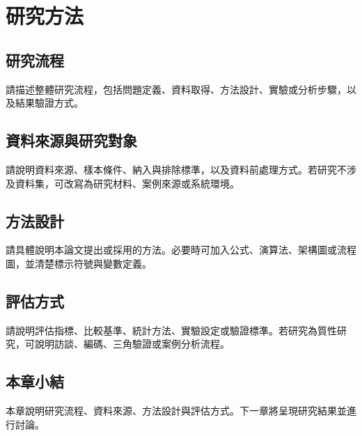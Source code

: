 \chapter{研究方法}

\section{研究流程}

請描述整體研究流程，包括問題定義、資料取得、方法設計、實驗或分析步驟，以及結果驗證方式。

\section{資料來源與研究對象}

請說明資料來源、樣本條件、納入與排除標準，以及資料前處理方式。若研究不涉及資料集，可改寫為研究材料、案例來源或系統環境。

\section{方法設計}

請具體說明本論文提出或採用的方法。必要時可加入公式、演算法、架構圖或流程圖，並清楚標示符號與變數定義。

\section{評估方式}

請說明評估指標、比較基準、統計方法、實驗設定或驗證標準。若研究為質性研究，可說明訪談、編碼、三角驗證或案例分析流程。

\section{本章小結}

本章說明研究流程、資料來源、方法設計與評估方式。下一章將呈現研究結果並進行討論。
